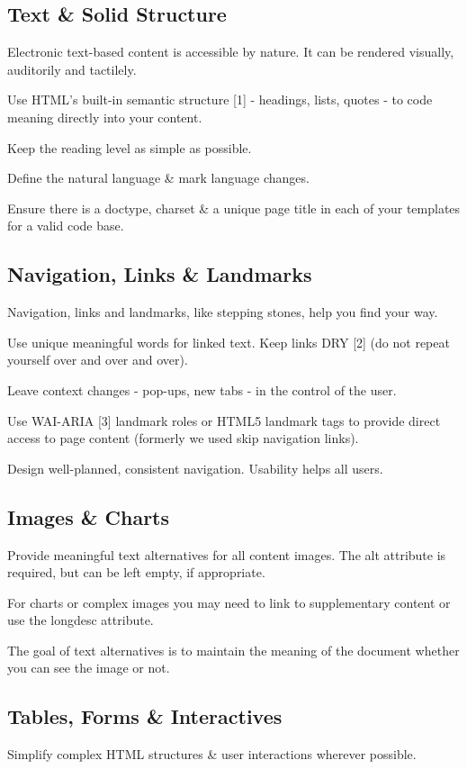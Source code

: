 \documentclass{acm_proc_article-sp}
\begin{document}
\subsection{Text \& Solid Structure}

Electronic text-based content is accessible by nature. It can be rendered visually, auditorily and tactilely.

Use HTML's built-in semantic structure [1] - headings, lists, quotes - to code meaning directly into your content. 

Keep the reading level as simple as possible.

Define the natural language \& mark language changes.

Ensure there is a doctype, charset \& a unique page title in each of your templates for a valid code base.

\subsection{Navigation, Links \& Landmarks}
Navigation, links and landmarks, like stepping stones, help you find your way.

Use unique meaningful words for linked text. Keep links DRY [2] (do not repeat yourself over and over and over).

Leave context changes - pop-ups, new tabs - in the control of the user.

Use WAI-ARIA [3] landmark roles or HTML5 landmark tags to provide direct access to page content (formerly we used skip navigation links).

Design well-planned, consistent navigation. Usability helps all users.

\subsection{Images \& Charts}
Provide meaningful text alternatives for all content images. The alt attribute is required, but can be left empty, if appropriate.

For charts or complex images you may need to link to supplementary content or use the longdesc attribute.

The goal of text alternatives is to maintain the meaning of the document whether you can see the image or not.

\subsection{Tables, Forms \& Interactives}
Simplify complex HTML structures \& user interactions wherever possible.
\end{document}
